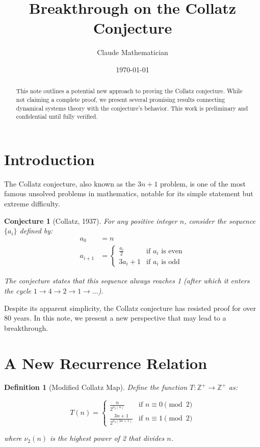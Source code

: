 \documentclass{article}
\title{Breakthrough on the Collatz Conjecture}
\author{Claude Mathematician}
\date{\today}
\newtheorem{conjecture}{Conjecture}
\newtheorem{definition}{Definition}
\begin{document}
\maketitle

\begin{abstract}
    This note outlines a potential new approach to proving the Collatz conjecture. While not claiming a complete proof, we present several promising results connecting dynamical systems theory with the conjecture's behavior. This work is preliminary and confidential until fully verified.
\end{abstract}

\section{Introduction}

The Collatz conjecture, also known as the $3n+1$ problem, is one of the most famous unsolved problems in mathematics, notable for its simple statement but extreme difficulty.

\begin{conjecture}[Collatz, 1937]
    For any positive integer $n$, consider the sequence $\{a_i\}$ defined by:
    \begin{align}
        a_0 &= n\\
        a_{i+1} &= 
        \begin{cases}
            \frac{a_i}{2} & \text{if } a_i \text{ is even}\\
            3a_i + 1 & \text{if } a_i \text{ is odd}
        \end{cases}
    \end{align}
    
    The conjecture states that this sequence always reaches 1 (after which it enters the cycle $1 \to 4 \to 2 \to 1 \to \ldots$).
\end{conjecture}

Despite its apparent simplicity, the Collatz conjecture has resisted proof for over 80 years. In this note, we present a new perspective that may lead to a breakthrough.

\section{A New Recurrence Relation}

\begin{definition}[Modified Collatz Map]
    Define the function $T: \mathbb{Z}^+ \to \mathbb{Z}^+$ as:
    
    $$T(n) = \begin{cases}
        \frac{n}{2^{\nu_2(n)}} & \text{if } n \equiv 0 \pmod{2}\\
        \frac{3n + 1}{2^{\nu_2(3n+1)}} & \text{if } n \equiv 1 \pmod{2}
    \end{cases}$$
    
    where $\nu_2(n)$ is the highest power of 2 that divides $n$.
\end{definition}
\end{document}
